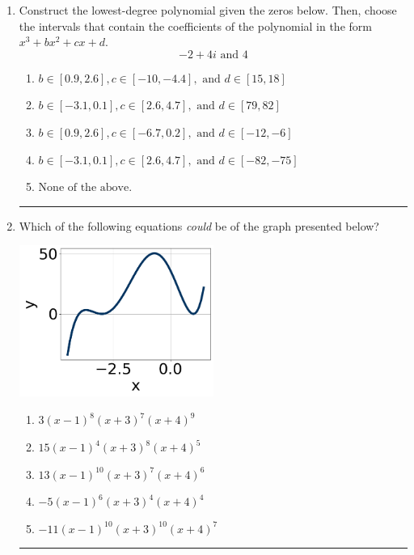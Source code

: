\documentclass[14pt]{extbook}
\newcommand{\litem}[1]{\item#1\hspace*{-1cm}\rule{\textwidth}{0.4pt}}
\begin{document}
\begin{enumerate}
{\begin{enumerate}[label=\Alph*.]
\end{enumerate} }
\litem{
Construct the lowest-degree polynomial given the zeros below. Then, choose the intervals that contain the coefficients of the polynomial in the form $x^3+bx^2+cx+d$.\[ -2 + 4 i \text{ and } 4 \]\begin{enumerate}[label=\Alph*.]
\item \( b \in [0.9, 2.6], c \in [-10, -4.4], \text{ and } d \in [15, 18] \)
\item \( b \in [-3.1, 0.1], c \in [2.6, 4.7], \text{ and } d \in [79, 82] \)
\item \( b \in [0.9, 2.6], c \in [-6.7, 0.2], \text{ and } d \in [-12, -6] \)
\item \( b \in [-3.1, 0.1], c \in [2.6, 4.7], \text{ and } d \in [-82, -75] \)
\item \( \text{None of the above.} \)

\end{enumerate} }
\litem{
Which of the following equations \textit{could} be of the graph presented below?
\begin{center}
    \includegraphics[width=0.5\textwidth]{../Figures/polyGraphToFunctionCopyA.png}
\end{center}
\begin{enumerate}[label=\Alph*.]
\item \( 3(x - 1)^{8} (x + 3)^{7} (x + 4)^{9} \)
\item \( 15(x - 1)^{4} (x + 3)^{8} (x + 4)^{5} \)
\item \( 13(x - 1)^{10} (x + 3)^{7} (x + 4)^{6} \)
\item \( -5(x - 1)^{6} (x + 3)^{4} (x + 4)^{4} \)
\item \( -11(x - 1)^{10} (x + 3)^{10} (x + 4)^{7} \)


\end{enumerate}}
\end{enumerate}
\end{document}
